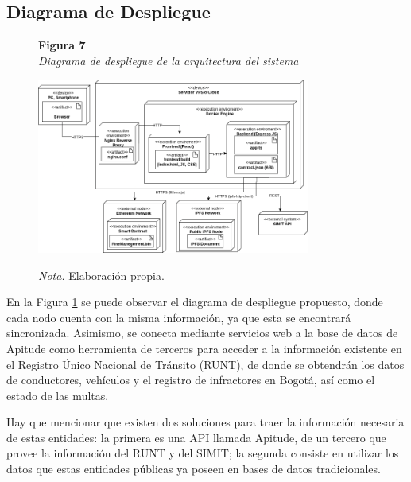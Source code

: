  \subsection{ Diagrama de Despliegue }
\begin{figure}[htbp]
    \begin{flushleft}
        \textbf{Figura 7}\\[2em]
        \textit{Diagrama de despliegue de la arquitectura del sistema}
    \end{flushleft}
    \vspace{1em}
    \centering
    \includegraphics[width=0.8\textwidth]{Images/Despliegue.png}
    \vspace{2em}
    \begin{flushleft}
        \textit{Nota.} Elaboración propia.
    \end{flushleft}
    \label{fig:diagrama_despliegue}
\end{figure}

En la Figura \ref{fig:diagrama_despliegue} se puede observar el diagrama de despliegue propuesto, donde cada nodo cuenta con la misma información, ya que esta se encontrará sincronizada. Asimismo, se conecta mediante servicios web a la base de datos de Apitude como herramienta de terceros para acceder a la información existente en el Registro Único Nacional de Tránsito (RUNT), de donde se obtendrán los datos de conductores, vehículos y el registro de infractores en Bogotá, así como el estado de las multas.

Hay que mencionar que existen dos soluciones para traer la información necesaria de estas entidades: la primera es una API llamada Apitude, de un tercero que provee la información del RUNT y del SIMIT; la segunda consiste en utilizar los datos que estas entidades públicas ya poseen en bases de datos tradicionales. 

